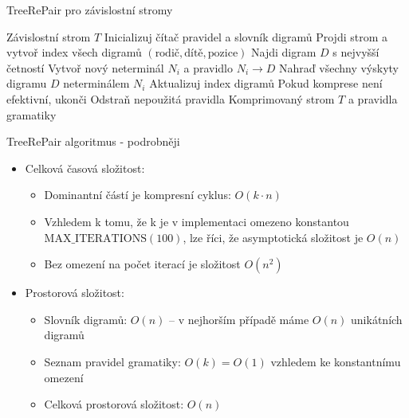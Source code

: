 \documentclass[lualatex,hyperref={pdfencoding=auto}]{beamer}
\begin{document}
\begin{frame}{TreeRePair pro závislostní stromy}
\begin{algorithm}[H]
\caption{TreeRePair -- zjednodušený pseudokód} 
\begin{algorithmic}[1] 
  \REQUIRE Závislostní strom $T$ 
  \STATE Inicializuj čítač pravidel a slovník digramů 
  \STATE Projdi strom a vytvoř index všech digramů $(\text{rodič}, \text{dítě}, \text{pozice})$ 
  \STATE Najdi digram $D$ s nejvyšší četností 
  \STATE Vytvoř nový neterminál $N_i$ a pravidlo $N_i 
  \rightarrow D$ 
  \STATE Nahraď všechny výskyty digramu $D$ neterminálem $N_i$ 
  \STATE Aktualizuj index digramů 
  \STATE Pokud komprese není efektivní, ukonči 
  \ENDWHILE 
  \STATE Odstraň nepoužitá pravidla 
  \RETURN Komprimovaný strom $T$ a pravidla gramatiky 
\end{algorithmic} 
\end{algorithm}

\end{frame}

\begin{frame}{TreeRePair algoritmus - podrobněji}
      \begin{itemize}
        \item Celková časová složitost:
        \begin{itemize}
          \item Dominantní částí je kompresní cyklus: $O(k \cdot n)$
          \item Vzhledem k tomu, že k je v implementaci omezeno konstantou $\text{MAX\_ITERATIONS} (100)$, lze říci, že asymptotická složitost je $O(n)$
          \item Bez omezení na počet iterací je složitost $O(n^2)$
        \end{itemize}
      \end{itemize}
      \begin{itemize}
        \item Prostorová složitost:
        \begin{itemize}
          \item Slovník digramů: $O(n)$ -- v nejhorším případě máme $O(n)$ unikátních digramů
          \item Seznam pravidel gramatiky: $O(k) = O(1)$ vzhledem ke konstantnímu omezení
          \item Celková prostorová složitost: $O(n)$
        \end{itemize}
      \end{itemize}
\end{frame}
\end{document}
